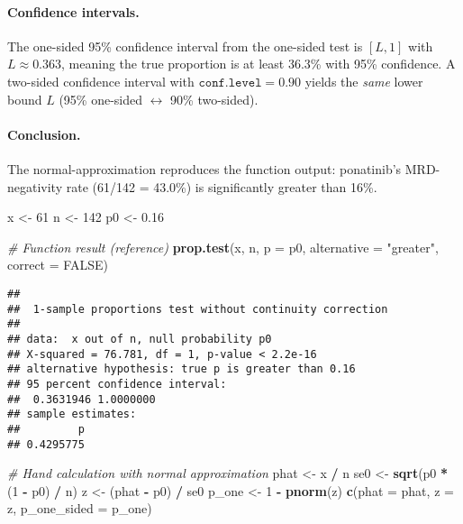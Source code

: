 \documentclass[
]{article}
\newenvironment{Shaded}{\begin{snugshade}}{\end{snugshade}}
\newcommand{\AttributeTok}[1]{\textcolor[rgb]{0.13,0.29,0.53}{#1}}
\newcommand{\CommentTok}[1]{\textcolor[rgb]{0.56,0.35,0.01}{\textit{#1}}}
\newcommand{\ConstantTok}[1]{\textcolor[rgb]{0.56,0.35,0.01}{#1}}
\newcommand{\DecValTok}[1]{\textcolor[rgb]{0.00,0.00,0.81}{#1}}
\newcommand{\FloatTok}[1]{\textcolor[rgb]{0.00,0.00,0.81}{#1}}
\newcommand{\FunctionTok}[1]{\textcolor[rgb]{0.13,0.29,0.53}{\textbf{#1}}}
\newcommand{\NormalTok}[1]{#1}
\newcommand{\OtherTok}[1]{\textcolor[rgb]{0.56,0.35,0.01}{#1}}
\newcommand{\SpecialCharTok}[1]{\textcolor[rgb]{0.81,0.36,0.00}{\textbf{#1}}}
\newcommand{\StringTok}[1]{\textcolor[rgb]{0.31,0.60,0.02}{#1}}
\begin{document}
\paragraph{Confidence intervals.}

The one-sided 95\% confidence interval from the one-sided test is
\([L,1]\) with \(L\approx 0.363\), meaning the true proportion is at
least 36.3\% with 95\% confidence. A two-sided confidence interval with
\(\texttt{conf.level}=0.90\) yields the \emph{same} lower bound \(L\)
(95\% one-sided \(\leftrightarrow\) 90\% two-sided).

\paragraph{Conclusion.}

The normal-approximation reproduces the function output: ponatinib's
MRD-negativity rate (61/142 = 43.0\%) is significantly greater than
16\%.

\begin{Shaded}
\begin{Highlighting}[]
\NormalTok{x  }\OtherTok{\textless{}{-}} \DecValTok{61}
\NormalTok{n  }\OtherTok{\textless{}{-}} \DecValTok{142}
\NormalTok{p0 }\OtherTok{\textless{}{-}} \FloatTok{0.16}

\CommentTok{\# Function result (reference)}
\FunctionTok{prop.test}\NormalTok{(x, n, }\AttributeTok{p =}\NormalTok{ p0, }\AttributeTok{alternative =} \StringTok{"greater"}\NormalTok{, }\AttributeTok{correct =} \ConstantTok{FALSE}\NormalTok{)}
\end{Highlighting}
\end{Shaded}

\begin{verbatim}
## 
##  1-sample proportions test without continuity correction
## 
## data:  x out of n, null probability p0
## X-squared = 76.781, df = 1, p-value < 2.2e-16
## alternative hypothesis: true p is greater than 0.16
## 95 percent confidence interval:
##  0.3631946 1.0000000
## sample estimates:
##         p 
## 0.4295775
\end{verbatim}

\begin{Shaded}
\begin{Highlighting}[]
\CommentTok{\# Hand calculation with normal approximation}
\NormalTok{phat }\OtherTok{\textless{}{-}}\NormalTok{ x }\SpecialCharTok{/}\NormalTok{ n}
\NormalTok{se0  }\OtherTok{\textless{}{-}} \FunctionTok{sqrt}\NormalTok{(p0 }\SpecialCharTok{*}\NormalTok{ (}\DecValTok{1} \SpecialCharTok{{-}}\NormalTok{ p0) }\SpecialCharTok{/}\NormalTok{ n)}
\NormalTok{z    }\OtherTok{\textless{}{-}}\NormalTok{ (phat }\SpecialCharTok{{-}}\NormalTok{ p0) }\SpecialCharTok{/}\NormalTok{ se0}
\NormalTok{p\_one }\OtherTok{\textless{}{-}} \DecValTok{1} \SpecialCharTok{{-}} \FunctionTok{pnorm}\NormalTok{(z)}
\FunctionTok{c}\NormalTok{(}\AttributeTok{phat =}\NormalTok{ phat, }\AttributeTok{z =}\NormalTok{ z, }\AttributeTok{p\_one\_sided =}\NormalTok{ p\_one)}
\end{Highlighting}
\end{Shaded}
\end{document}
